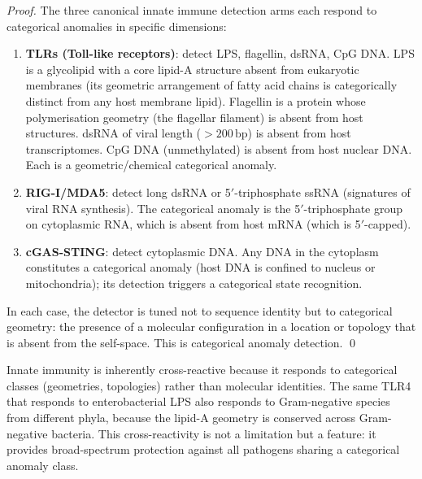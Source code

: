 \begin{proof}
The three canonical innate immune detection arms each respond to categorical
anomalies in specific dimensions:
\begin{enumerate}[label=(\roman*)]
  \item \textbf{TLRs (Toll-like receptors)}: detect LPS, flagellin, dsRNA,
        CpG DNA. LPS is a glycolipid with a core lipid-A structure absent from
        eukaryotic membranes (its geometric arrangement of fatty acid chains is
        categorically distinct from any host membrane lipid). Flagellin is a
        protein whose polymerisation geometry (the flagellar filament) is
        absent from host structures. dsRNA of viral length ($> 200\,\mathrm{bp}$)
        is absent from host transcriptomes. CpG DNA (unmethylated) is absent
        from host nuclear DNA. Each is a geometric/chemical categorical anomaly.
  \item \textbf{RIG-I/MDA5}: detect long dsRNA or 5$'$-triphosphate ssRNA
        (signatures of viral RNA synthesis). The categorical anomaly is the
        5$'$-triphosphate group on cytoplasmic RNA, which is absent from
        host mRNA (which is 5$'$-capped).
  \item \textbf{cGAS-STING}: detect cytoplasmic DNA. Any DNA in the cytoplasm
        constitutes a categorical anomaly (host DNA is confined to nucleus
        or mitochondria); its detection triggers a categorical state recognition.
\end{enumerate}
In each case, the detector is tuned not to sequence identity but to categorical
geometry: the presence of a molecular configuration in a location or topology
that is absent from the self-space. This is categorical anomaly detection. \qed
\end{proof}

\begin{corollary}
\label{cor:innate_crossreactive}
Innate immunity is inherently cross-reactive because it responds to categorical
classes (geometries, topologies) rather than molecular identities. The same
TLR4 that responds to enterobacterial LPS also responds to Gram-negative
species from different phyla, because the lipid-A geometry is conserved across
Gram-negative bacteria. This cross-reactivity is not a limitation but a feature:
it provides broad-spectrum protection against all pathogens sharing a categorical
anomaly class.
\end{corollary}

